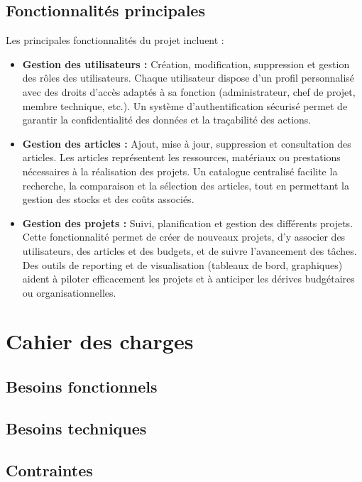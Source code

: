 \documentclass[12pt,a4paper]{report}
\begin{document}
\section{Fonctionnalités principales}
Les principales fonctionnalités du projet incluent :
\begin{itemize}
    \item \textbf{Gestion des utilisateurs :} Création, modification, suppression et gestion des rôles des utilisateurs. Chaque utilisateur dispose d’un profil personnalisé avec des droits d’accès adaptés à sa fonction (administrateur, chef de projet, membre technique, etc.). Un système d’authentification sécurisé permet de garantir la confidentialité des données et la traçabilité des actions.
    \item \textbf{Gestion des articles :} Ajout, mise à jour, suppression et consultation des articles. Les articles représentent les ressources, matériaux ou prestations nécessaires à la réalisation des projets. Un catalogue centralisé facilite la recherche, la comparaison et la sélection des articles, tout en permettant la gestion des stocks et des coûts associés.
    \item \textbf{Gestion des projets :} Suivi, planification et gestion des différents projets. Cette fonctionnalité permet de créer de nouveaux projets, d’y associer des utilisateurs, des articles et des budgets, et de suivre l’avancement des tâches. Des outils de reporting et de visualisation (tableaux de bord, graphiques) aident à piloter efficacement les projets et à anticiper les dérives budgétaires ou organisationnelles.
\end{itemize}

\chapter{Cahier des charges}
\section{Besoins fonctionnels}
\section{Besoins techniques}
\section{Contraintes}

\end{document}
